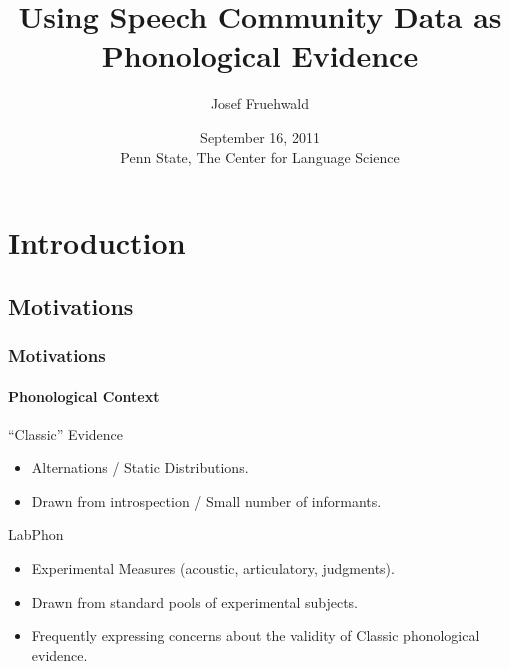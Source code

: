 \documentclass[]{beamer}
\title{Using Speech Community Data as Phonological Evidence}
\author{Josef Fruehwald}
\institute{University of Pennsylvania}
\date{September 16, 2011\\Penn State, The Center for Language Science}
\begin{document}
\begin{frame}
	\titlepage
\end{frame}

\section{Introduction}

\subsection{Motivations}

\begin{frame}
	\frametitle{Motivations}
	\framesubtitle{Phonological Context}
	
	\begin{block}{``Classic'' Evidence}
		\begin{itemize}
			\item Alternations / Static Distributions.
			\item Drawn from introspection / Small number of informants.
		\end{itemize}
	\end{block}
	
	\begin{block}{LabPhon}
		\begin{itemize}
			\item Experimental Measures (acoustic, articulatory, judgments).
			\item Drawn from standard pools of experimental subjects.
			\item Frequently expressing concerns about the validity of Classic phonological evidence.
		\end{itemize}
	\end{block}
	
\end{frame}
\end{document}
